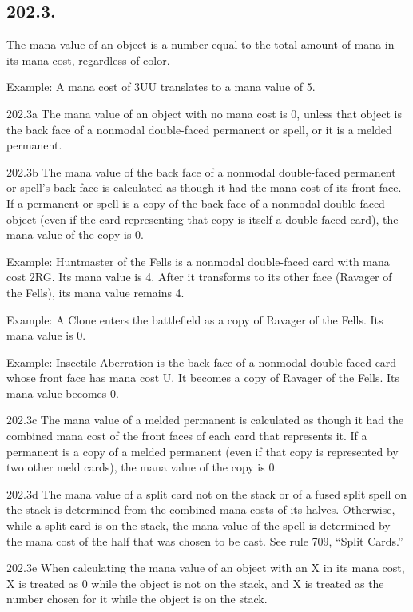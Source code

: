 \subsection*{202.3.}
The mana value of an object is a number equal to the total amount of mana in its mana cost, regardless of color.

Example: A mana cost of {3}{U}{U} translates to a mana value of 5.

202.3a The mana value of an object with no mana cost is 0, unless that object is the back face of a nonmodal double-faced permanent or spell, or it is a melded permanent.

202.3b The mana value of the back face of a nonmodal double-faced permanent or spell’s back face is calculated as though it had the mana cost of its front face. If a permanent or spell is a copy of the back face of a nonmodal double-faced object (even if the card representing that copy is itself a double-faced card), the mana value of the copy is 0.

Example: Huntmaster of the Fells is a nonmodal double-faced card with mana cost {2}{R}{G}. Its mana value is 4. After it transforms to its other face (Ravager of the Fells), its mana value remains 4.

Example: A Clone enters the battlefield as a copy of Ravager of the Fells. Its mana value is 0.

Example: Insectile Aberration is the back face of a nonmodal double-faced card whose front face has mana cost {U}. It becomes a copy of Ravager of the Fells. Its mana value becomes 0.

202.3c The mana value of a melded permanent is calculated as though it had the combined mana cost of the front faces of each card that represents it. If a permanent is a copy of a melded permanent (even if that copy is represented by two other meld cards), the mana value of the copy is 0.

202.3d The mana value of a split card not on the stack or of a fused split spell on the stack is determined from the combined mana costs of its halves. Otherwise, while a split card is on the stack, the mana value of the spell is determined by the mana cost of the half that was chosen to be cast. See rule 709, “Split Cards.”

202.3e When calculating the mana value of an object with an {X} in its mana cost, X is treated as 0 while the object is not on the stack, and X is treated as the number chosen for it while the object is on the stack.

